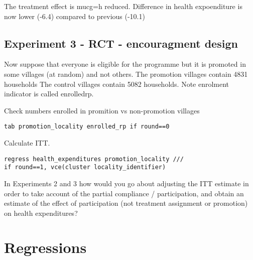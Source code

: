 \documentclass[12pt]{article}
\begin{document}
The treatment effect is mucg=h reduced. Difference in health expoenditure is now lower (-6.4) compared to previous (-10.1)

\subsection{Experiment 3 - RCT - encouragment design}



Now suppose that everyone is eligible for the programme but it is promoted in some villages (at random) and not others. The promotion villages contain 4831 households The control villages contain 5082 households. Note enrolment indicator is called enrolledrp. 


 Check numbers enrolled in promition vs non-promotion villages
\begin{verbatim}
tab promotion_locality enrolled_rp if round==0
\end{verbatim}

Calculate ITT. 

\begin{verbatim}
regress health_expenditures promotion_locality ///
if round==1, vce(cluster locality_identifier)
\end{verbatim}

In Experiments 2 and 3 how would you go about adjusting the ITT estimate in order to take account of the partial compliance / participation, and obtain an estimate of the effect of participation (not treatment assignment or promotion) on health expenditures? 

\vspace{5pt}



\clearpage




\clearpage
\section{Regressions} \label{sec:regressions}




\clearpage
 
\end{document}

